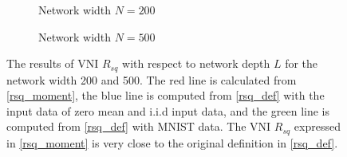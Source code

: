 \begin{figure}[h]
\centering
\newcommand{\myWidth}{0.48\textwidth}
\begin{subfigure}{\myWidth}
  \centering
  \caption{Network width $N=200$}
  \label{fig:sec4_sim2_a}
\end{subfigure}

\begin{subfigure}{\myWidth}
  \centering
  \caption{Network width $N=500$}
  \label{fig:sec4_sim2_b}
\end{subfigure}%

\caption{
The results of VNI $R_{sq}$ with respect to network depth $L$ for the network width 200 and 500. The red line is calculated from \eqref{rsq_moment}, the blue line is computed from \eqref{rsq_def} with the input data of zero mean and i.i.d input data, and the green line is computed from \eqref{rsq_def} with MNIST data.
The VNI $R_{sq}$ expressed in \eqref{rsq_moment} is very close to the original definition in \eqref{rsq_def}.
}
\label{fig:sec4_sim2}
\end{figure}

